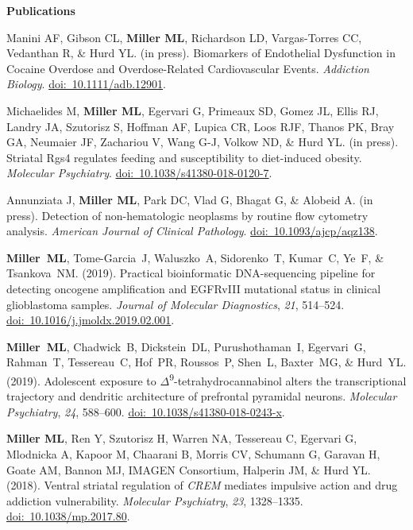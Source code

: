 \documentclass[10pt]{article}
\begin{document}
\vspace{0.1in}
{\large \textbf{Publications}}

\begin{description}
\item Manini AF, Gibson CL, \textbf{Miller ML}, Richardson LD, Vargas-Torres CC, Vedanthan R, \& Hurd YL. (in press). Biomarkers of Endothelial Dysfunction in Cocaine Overdose and Overdose-Related Cardiovascular Events. \textit{Addiction Biology}. \href{https://doi.org/10.1111/adb.12901}{doi:~10.1111/adb.12901}.
\item Michaelides M, \textbf{Miller ML}, Egervari G, Primeaux SD, Gomez JL, Ellis RJ, Landry JA, Szutorisz S, Hoffman AF, Lupica CR, Loos RJF, Thanos PK, Bray GA, Neumaier JF, Zachariou V, Wang G-J, Volkow ND, \& Hurd YL. (in press). Striatal Rgs4 regulates feeding and susceptibility to diet-induced obesity. \textit{Molecular Psychiatry}. \href{https://doi.org/10.1038/s41380-018-0120-7}{doi:~10.1038/s41380-018-0120-7}.
\item Annunziata J, \textbf{Miller ML}, Park DC, Vlad G, Bhagat G, \& Alobeid A. (in press). Detection of non-hematologic neoplasms by routine flow cytometry analysis. \textit{American Journal of Clinical Pathology}. \href{https://doi.org/10.1093/ajcp/aqz138}{doi:~10.1093/ajcp/aqz138}.
\item \textbf{Miller~ML}, Tome-Garcia~J, Waluszko~A, Sidorenko~T, Kumar~C, Ye~F, \& Tsankova~NM. (2019). Practical bioinformatic DNA-sequencing pipeline for detecting oncogene amplification and EGFRvIII mutational status in clinical glioblastoma samples. \textit{Journal of Molecular Diagnostics}, \textit{21}, 514--524. \href{https://doi.org/10.1016/j.jmoldx.2019.02.001}{doi:~10.1016/j.jmoldx.2019.02.001}.
\item \textbf{Miller~ML}, Chadwick~B, Dickstein~DL, Purushothaman~I, Egervari~G, Rahman~T, Tessereau~C, Hof~PR, Roussos~P, Shen~L, Baxter~MG, \& Hurd~YL. (2019). Adolescent exposure to $\Delta$\textsuperscript{9}-tetrahydrocannabinol alters the transcriptional trajectory and dendritic architecture of prefrontal pyramidal neurons. \textit{Molecular Psychiatry}, \textit{24}, 588--600. \href{https://doi.org/10.1038/s41380-018-0243-x}{doi:~10.1038/s41380-018-0243-x}.
\item \textbf{Miller ML}, Ren Y, Szutorisz H, Warren NA, Tessereau C, Egervari G, Mlodnicka A, Kapoor M, Chaarani B, Morris CV, Schumann G, Garavan H, Goate AM, Bannon MJ, IMAGEN Consortium, Halperin JM, \& Hurd YL. (2018). Ventral striatal regulation of \textit{CREM} mediates impulsive action and drug addiction vulnerability. \textit{Molecular Psychiatry}, \textit{23}, 1328--1335. \href{https://doi.org/10.1038/mp.2017.80}{doi:~10.1038/mp.2017.80}.

\end{description}
\end{document}
